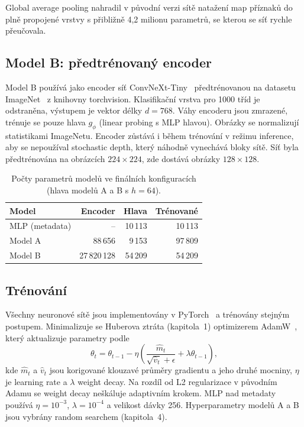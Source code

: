 Global average pooling nahradil v původní verzi sítě natažení map příznaků do plně propojené
vrstvy s přibližně 4,2 milionu parametrů, se kterou se síť rychle přeučovala.

\subsection*{Model B: předtrénovaný encoder}

Model B používá jako encoder síť ConvNeXt-Tiny~\cite{liu2022convnext} předtrénovanou
na datasetu ImageNet~\cite{deng2009imagenet} z knihovny torchvision. Klasifikační vrstva
pro 1000 tříd je odstraněna, výstupem je vektor délky $d = 768$. Váhy encoderu jsou zmrazené,
trénuje se pouze hlava $g_\phi$ (linear probing s MLP hlavou). Obrázky se normalizují
statistikami ImageNetu. Encoder zůstává i během trénování v režimu inference, aby se nepoužíval
stochastic depth, který náhodně vynechává bloky sítě. Síť byla předtrénována na obrázcích
$224 \times 224$, zde dostává obrázky $128 \times 128$.

\begin{table}[h]
    \centering
    \begin{tabular}{lrrr}
        \toprule
        Model & Encoder & Hlava & Trénované \\
        \midrule
        MLP (metadata) & -- & 10\,113 & 10\,113 \\
        Model A & 88\,656 & 9\,153 & 97\,809 \\
        Model B & 27\,820\,128 & 54\,209 & 54\,209 \\
        \bottomrule
    \end{tabular}
    \caption{Počty parametrů modelů ve finálních konfiguracích (hlava modelů A a B s $h = 64$).}
    \label{tab:parametry}
\end{table}

\subsection*{Trénování}

Všechny neuronové sítě jsou implementovány v PyTorch~\cite{paszke2019pytorch} a trénovány
stejným postupem. Minimalizuje se Huberova ztráta (kapitola~1) optimizerem
AdamW~\cite{loshchilov2019adamw}, který aktualizuje parametry podle
\begin{equation}
    \theta_t = \theta_{t-1} - \eta \left( \frac{\hat{m}_t}{\sqrt{\hat{v}_t} + \epsilon} + \lambda \theta_{t-1} \right),
\end{equation}
kde $\hat{m}_t$ a $\hat{v}_t$ jsou korigované klouzavé průměry gradientu a jeho druhé mocniny,
$\eta$ je learning rate a $\lambda$ weight decay. Na rozdíl od L2 regularizace v původním
Adamu se weight decay neškáluje adaptivním krokem. MLP nad metadaty používá $\eta = 10^{-3}$,
$\lambda = 10^{-4}$ a velikost dávky 256. Hyperparametry modelů A a B jsou vybrány random
searchem (kapitola~4).

